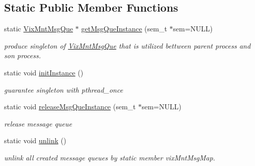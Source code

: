 \subsection*{Static Public Member Functions}
\begin{DoxyCompactItemize}
\item 
static \hyperlink{class_vix_mnt_msg_que}{Vix\+Mnt\+Msg\+Que} $\ast$ \hyperlink{class_vix_mnt_msg_que_a16aa3ef3cdaf66b4eb09fd8a58840dbb}{get\+Msg\+Que\+Instance} (sem\+\_\+t $\ast$sem=N\+U\+LL)
\begin{DoxyCompactList}\small\item\em produce singleton of \hyperlink{class_vix_mnt_msg_que}{Vix\+Mnt\+Msg\+Que} that is utilized bettween parent process and son process. \end{DoxyCompactList}\item 
\hypertarget{class_vix_mnt_msg_que_a656d5ed77ebae6340dfb5918429166e4}{}\label{class_vix_mnt_msg_que_a656d5ed77ebae6340dfb5918429166e4} 
static void \hyperlink{class_vix_mnt_msg_que_a656d5ed77ebae6340dfb5918429166e4}{init\+Instance} ()
\begin{DoxyCompactList}\small\item\em guarantee singleton with pthread\+\_\+once \end{DoxyCompactList}\item 
static void \hyperlink{class_vix_mnt_msg_que_a37287bf5572e8c9311aa9e8cde04cdf5}{release\+Msg\+Que\+Instance} (sem\+\_\+t $\ast$sem=N\+U\+LL)
\begin{DoxyCompactList}\small\item\em release message queue \end{DoxyCompactList}\item 
\hypertarget{class_vix_mnt_msg_que_af9cd79fba39d8a8d124d2cb97a6b7a74}{}\label{class_vix_mnt_msg_que_af9cd79fba39d8a8d124d2cb97a6b7a74} 
static void \hyperlink{class_vix_mnt_msg_que_af9cd79fba39d8a8d124d2cb97a6b7a74}{unlink} ()
\begin{DoxyCompactList}\small\item\em unlink all created message queues by static member vix\+Mnt\+Msg\+Map. \end{DoxyCompactList}\end{DoxyCompactItemize}
